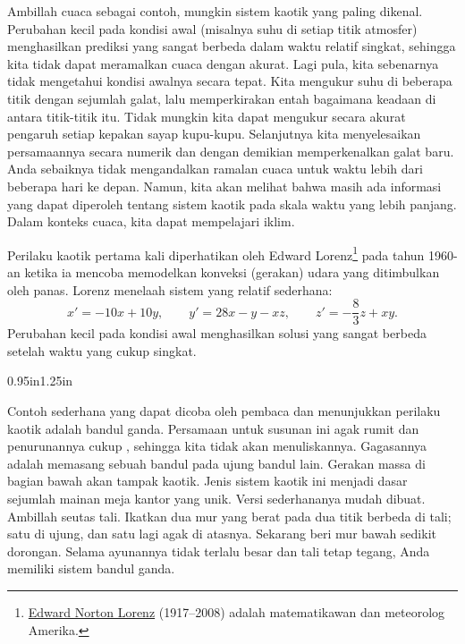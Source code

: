 Ambillah cuaca sebagai contoh, mungkin sistem kaotik yang paling dikenal.
Perubahan kecil pada kondisi awal
(misalnya suhu di setiap titik atmosfer) menghasilkan prediksi yang sangat
berbeda dalam waktu relatif singkat, sehingga kita tidak dapat meramalkan
cuaca dengan akurat.  Lagi pula, kita sebenarnya tidak mengetahui kondisi
awalnya secara tepat.  Kita mengukur suhu di beberapa titik dengan sejumlah
galat, lalu memperkirakan entah bagaimana keadaan di antara titik-titik itu.
Tidak mungkin kita dapat mengukur secara akurat pengaruh setiap kepakan sayap
kupu-kupu.  Selanjutnya kita menyelesaikan persamaannya secara numerik dan
dengan demikian memperkenalkan galat baru.  Anda sebaiknya tidak mengandalkan
ramalan cuaca untuk waktu lebih dari beberapa hari ke depan.  Namun, kita akan
melihat bahwa masih ada informasi yang dapat diperoleh tentang sistem kaotik
pada skala waktu yang lebih panjang.  Dalam konteks cuaca, kita dapat
mempelajari iklim.

Perilaku kaotik pertama kali diperhatikan oleh Edward
Lorenz\footnote{\href{https://en.wikipedia.org/wiki/Edward_Norton_Lorenz}{Edward Norton Lorenz} (1917--2008) adalah
matematikawan dan meteorolog Amerika.}
pada tahun 1960-an ketika ia mencoba memodelkan konveksi (gerakan) udara yang
ditimbulkan oleh panas.  Lorenz menelaah sistem yang relatif sederhana:
\begin{equation*}
x' = -10x +10y, \qquad y' = 28x-y-xz, \qquad z'=-\frac{8}{3}z + xy .
\end{equation*}
Perubahan kecil pada kondisi awal menghasilkan solusi yang sangat berbeda
setelah waktu yang cukup singkat.

\begin{mywrapfigsimp}{0.95in}{1.25in}
\noindent
{}
\end{mywrapfigsimp}
Contoh sederhana yang dapat dicoba oleh pembaca dan menunjukkan perilaku
kaotik adalah bandul ganda.  Persamaan untuk susunan ini agak rumit dan
penurunannya cukup
, sehingga kita tidak akan menuliskannya.  Gagasannya
adalah memasang sebuah bandul pada ujung bandul lain.  Gerakan massa di bagian
bawah akan tampak kaotik.  Jenis sistem kaotik ini menjadi dasar sejumlah
mainan meja kantor yang unik.  Versi sederhananya mudah dibuat.  Ambillah
seutas tali.  Ikatkan dua mur yang berat pada dua titik berbeda di tali;
satu di ujung, dan satu lagi agak di atasnya.  Sekarang beri mur bawah sedikit
dorongan.  Selama ayunannya tidak terlalu besar dan tali tetap tegang, Anda
memiliki sistem bandul ganda.

